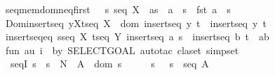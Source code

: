 \begin{isabellebody}
seq{\isacharunderscore}mem{\isacharunderscore}dom{\isacharunderscore}neq{\isacharunderscore}first{\isacharcolon}\ \ \ {\isachardoublequoteopen}{\isacharbrackleft}{\isacharbar}s{\isacharcolon}\ seq\ X\ {\isacharsemicolon}\ a{\isacharcolon}s\ {\isacharsemicolon}\ a\ {\isachartilde}{\isacharequal}\ {\isacharparenleft}{}{\isacharcomma}s{\isacharpercent}{\isacharcircum}{}{\isacharparenright}{\isacharbar}{\isacharbrackright}\ {\isacharequal}{\isacharequal}{\isachargreater}\ {\isacharparenleft}{\isacharparenleft}fst\ a{\isacharparenright}\ {\isacharcolon}\ {\isacharparenleft}{}{\isachardot}{\isachardot}{\isacharhash}s{\isacharparenright}{\isacharparenright}\ {\isachardoublequoteclose}\isanewline
Dom{\isacharunderscore}insertseq{\isacharcolon}\ {\isachardoublequoteopen}{\isacharbrackleft}{\isacharbar}y{\isacharcolon}X{\isacharsemicolon}t{\isacharcolon}seq\ X{\isacharbar}{\isacharbrackright}\ {\isacharequal}{\isacharequal}{\isachargreater}\ dom\ {\isacharparenleft}insertseq\ y\ t{\isacharparenright}\ {\isacharequal}\ {\isacharparenleft}{}{\isachardot}{\isachardot}{\isacharhash}{\isacharparenleft}insertseq\ y\ t{\isacharparenright}{\isacharparenright}{\isachardoublequoteclose}\isanewline
insertseq{\isacharunderscore}eq{\isacharcolon}\ {\isachardoublequoteopen}{\isacharbrackleft}{\isacharbar}s{\isacharcolon}seq\ X{\isacharsemicolon}\ t{\isacharcolon}seq\ Y{\isacharsemicolon}\ insertseq\ a\ s\ {\isacharequal}\ insertseq\ b\ t{\isacharbar}{\isacharbrackright}\ {\isacharequal}{\isacharequal}{\isachargreater}\ {\isacharparenleft}a{\isacharequal}b{\isacharparenright}{\isachardoublequoteclose}\isanewline
%
\isadelimML
\isanewline
%
\endisadelimML
%
\isatagML
{}\isamarkupfalse%
\isanewline
{\isacharverbatimopen}\isanewline
fun\ au\ i\ {\isacharequal}\ {\isacharparenleft}by\ {\isacharparenleft}SELECT{\isacharunderscore}GOAL\ {\isacharparenleft}auto{\isacharunderscore}tac\ {\isacharparenleft}claset{\isacharparenleft}{\isacharparenright}{\isacharcomma}\ simpset{\isacharparenleft}{\isacharparenright}{\isacharparenright}{\isacharparenright}\ {}{\isacharparenright}{\isacharparenright}\isanewline
{\isacharverbatimclose}%
\endisatagML
{\isafoldML}%
%
\isadelimML
\isanewline
%
\endisadelimML
\isanewline
{}\isamarkupfalse%
\ seqI{\isacharcolon}\ {\isachardoublequoteopen}{\isacharbang}{\isacharbang}s{\isachardot}\ {\isacharbrackleft}{\isacharbar}\ s\ {\isacharcolon}\ {\isacharpercent}N\ {\isacharminus}{\isacharbar}{\isacharbar}{\isacharminus}{\isachargreater}\ A\ {\isacharsemicolon}\ dom\ s\ {\isacharequal}\ {\isacharparenleft}\ {}\ {\isachardot}{\isachardot}\ {\isacharhash}\ s{\isacharparenright}\ {\isacharbar}{\isacharbrackright}\ {\isacharequal}{\isacharequal}{\isachargreater}\ s\ {\isacharcolon}\ seq\ A{\isachardoublequoteclose}\isanewline

\end{isabellebody}

